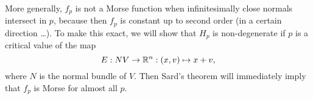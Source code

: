 More generally, $f_p$ is not a Morse function when infinitesimally close normals intersect in $p$, because then $f_p$ is constant up to second order (in a certain direction \ldots ).
To make this exact, we will show that $H_p$ is non-degenerate if $p$ is a critical value of the map
\[
    E: NV \to  \mathbb{R}^{n}: (x, v) \mapsto x + v
,\]
where $N$ is the normal bundle of $V$.
Then Sard's theorem will immediately imply that $f_p$ is Morse for almost all $p$.

\begin{figure}[H]
    \centering
    \label{fig:existence-of-morse-functions-normal-bundle-map}
\end{figure}

